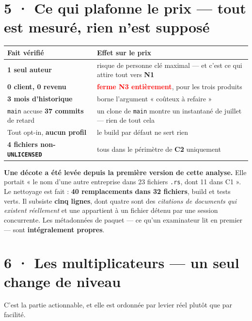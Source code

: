 \documentclass[10pt]{article}
\newcommand{\pire}[1]{\textcolor{red}{\textbf{#1}}}
\newcommand{\code}[1]{\texttt{\small #1}}
\begin{document}
\section{5 · Ce qui plafonne le prix --- tout est mesuré, rien n'est supposé}

\renewcommand{\arraystretch}{1.22}
\begin{center}\small
\begin{tabular}{@{}>{\raggedright\arraybackslash}p{6.6cm} >{\raggedright\arraybackslash}p{9.2cm}@{}}
\toprule
\textbf{Fait vérifié} & \textbf{Effet sur le prix} \\
\midrule
\textbf{1 seul auteur} & risque de personne clé maximal --- et c'est ce qui attire tout vers \textbf{N1} \\
\textbf{0 client, 0 revenu} & \pire{ferme N3 entièrement}, pour les trois produits \\
\textbf{3 mois d'historique} & borne l'argument « coûteux à refaire » \\
\code{main} accuse \textbf{37 commits} de retard & un clone de \code{main} montre un instantané de juillet --- rien de tout cela \\
Tout opt-in, \textbf{aucun profil} & le build par défaut ne sert rien \\
\textbf{4 fichiers non-\code{UNLICENSED}} & tous dans le périmètre de \textbf{C2} uniquement \\
\bottomrule
\end{tabular}
\end{center}

\begin{acquis}
\textbf{Une décote a été levée depuis la première version de cette analyse.} Elle portait « le nom d'une
autre entreprise dans 23 fichiers \code{.rs}, dont 11 dans C1 ». Le nettoyage est fait :
\textbf{40 remplacements dans 32 fichiers}, build et tests verts. Il subsiste \textbf{cinq lignes},
dont quatre sont des \emph{citations de documents qui existent réellement} et une appartient à un fichier
détenu par une session concurrente. Les métadonnées de paquet --- ce qu'un examinateur lit en premier
--- sont \textbf{intégralement propres}.
\end{acquis}

\section{6 · Les multiplicateurs --- un seul change de niveau}

C'est la partie actionnable, et elle est ordonnée par levier réel plutôt que par facilité.
\end{document}
